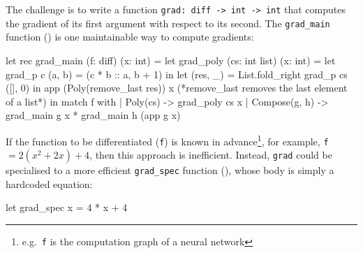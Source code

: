 The challenge is to write a function \texttt{grad: diff -> int -> int} that computes the gradient of its first argument with respect to its second. The \texttt{grad_main} function () is one maintainable way to compute gradients: 

\begin{code}
\begin{ocamllst}
let rec grad_main (f: diff) (x: int) = 
  let grad_poly (cs: int list) (x: int) = 
    let grad_p c (a, b) = (c * b :: a, b + 1) in
    let (res, _) = List.fold_right grad_p cs ([], 0) in 
    app (Poly(remove_last res)) x (*remove_last removes the last element of a list*)
  in match f with
    | Poly(cs)      -> grad_poly cs x
    | Compose(g, h) -> grad_main g x * grad_main h (app g x)

\end{ocamllst}
%
\label{listing:ocaml-grad-main}
\end{code}


If the function to be differentiated (\texttt{f}) is known in advance\footnote{e.g.\ \texttt{f} is the computation graph of a neural network}, for example, \texttt{f} $= 2(x^2 + 2x) + 4$, then this approach is inefficient. Instead, \texttt{grad} could be specialised to a more efficient \texttt{grad_spec} function (), whose body is simply a hardcoded equation:

\begin{code}
\begin{ocamllst}
let grad_spec x = 4 * x + 4
\end{ocamllst}
\label{listing:ocaml-grad-fast}
\end{code}    

